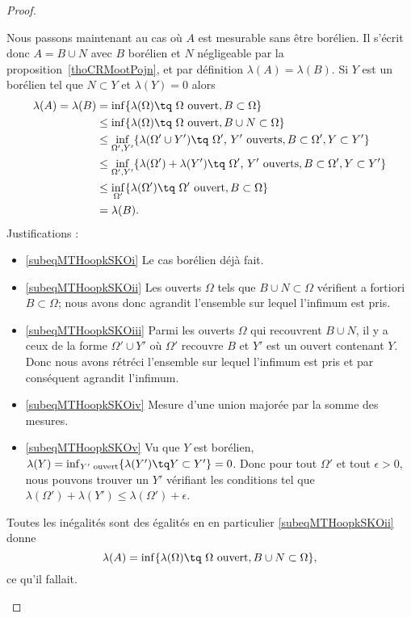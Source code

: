 \begin{proof}
\begin{subproof}
    Nous passons maintenant au cas où \( A \) est mesurable sans être borélien. Il s'écrit donc \( A=B\cup N\) avec \( B\) borélien et \( N\) négligeable par la proposition~\ref{thoCRMootPojn}, et par définition \( \lambda(A)=\lambda(B)\). Si \( Y\) est un borélien tel que \( N\subset Y\) et \( \lambda(Y)=0\) alors
    \begin{subequations}
        \begin{align}
            \lambda(A)=\lambda(B)&=\inf\{ \lambda(\Omega)\tq \text{ } \Omega\text{ ouvert}, B\subset\Omega \}\label{subeqMTHoopkSKOi}\\
            &\leq\inf\{ \lambda(\Omega)\tq \text{ } \Omega\text{ ouvert}, B\cup N\subset\Omega \}  \label{subeqMTHoopkSKOii}\\
            &\leq\inf_{\Omega',Y'}\{ \lambda(\Omega'\cup Y')\tq \text{ } \Omega'\text{, } Y'\text{ ouverts}, B\subset\Omega', Y\subset Y' \}\label{subeqMTHoopkSKOiii}\\
            &\leq\inf_{\Omega',Y'}\{ \lambda(\Omega')+\lambda(Y')\tq \text{ } \Omega'\text{, } Y'\text{ ouverts},  B\subset\Omega',Y\subset Y' \}\label{subeqMTHoopkSKOiv}\\
            &\leq\inf_{\Omega'}\{ \lambda(\Omega')\tq \text{ } \Omega'\text{ ouvert},  B\subset\Omega \}\label{subeqMTHoopkSKOv}\\
            &=\lambda(B).
        \end{align}
    \end{subequations}
    Justifications :
    \begin{itemize}
        \item \eqref{subeqMTHoopkSKOi} Le cas borélien déjà fait.
        \item \eqref{subeqMTHoopkSKOii} Les ouverts \( \Omega\) tels que \( B\cup N\subset \Omega\) vérifient a fortiori \( B\subset \Omega\); nous avons donc agrandit l'ensemble sur lequel l'infimum est pris.
        \item \eqref{subeqMTHoopkSKOiii} Parmi les ouverts \( \Omega\) qui recouvrent \( B\cup N\), il y a ceux de la forme \( \Omega'\cup Y'\) où \( \Omega'\) recouvre \( B\) et \( Y'\) est un ouvert contenant \( Y\). Donc nous avons rétréci l'ensemble sur lequel l'infimum est pris et par conséquent agrandit l'infimum.
        \item \eqref{subeqMTHoopkSKOiv} Mesure d'une union majorée par la somme des mesures.
        \item \eqref{subeqMTHoopkSKOv} Vu que \( Y\) est borélien, \( \lambda(Y)=\inf_{ Y'\text{ ouvert}}\{ \lambda(Y')\tq Y\subset Y' \}=0\). Donc pour tout \( \Omega'\) et tout \( \epsilon>0\), nous pouvons trouver un \( Y'\) vérifiant les conditions tel que \( \lambda(\Omega')+\lambda(Y')\leq \lambda(\Omega')+\epsilon\).
    \end{itemize}
    Toutes les inégalités sont des égalités en en particulier \eqref{subeqMTHoopkSKOii} donne
    \begin{equation}
        \lambda(A)=\inf\{ \lambda(\Omega)\tq \text{ } \Omega\text{ ouvert}, B\cup N\subset\Omega \},
    \end{equation}
    ce qu'il fallait.
    \end{subproof}


\end{proof}
